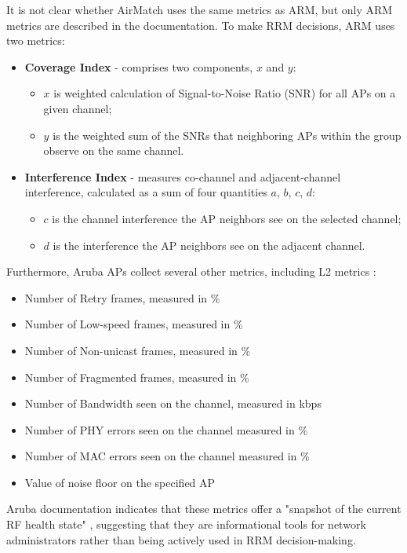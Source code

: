 It is not clear whether AirMatch uses the same metrics as ARM, but only ARM metrics are described in the documentation.
To make RRM decisions, ARM uses two metrics:
\begin{itemize}
    \item \textbf{Coverage Index} - comprises two components, $x$ and $y$:
    \begin{itemize}
        \item $x$ is weighted calculation of Signal-to-Noise Ratio (SNR) for all APs on a given channel;
        \item $y$ is the weighted sum of the SNRs that neighboring APs within the group observe on the same channel.
    \end{itemize}
    \item \textbf{Interference Index} - measures co-channel and adjacent-channel interference, calculated as a sum of four quantities $a$, $b$, $c$, $d$:
    \begin{itemize}
        \item $c$ is the channel interference the AP neighbors see on the selected channel;
        \item $d$ is the interference the AP neighbors see on the adjacent channel.
    \end{itemize}
\end{itemize}
Furthermore, Aruba APs collect several other metrics, including L2 metrics \cite{ArubaOSUserGuide}:

\begin{itemize}
    \item Number of Retry frames, measured in \%
    \item Number of Low-speed frames, measured in \%
    \item Number of Non-unicast frames, measured in \%
    \item Number of Fragmented frames, measured in \%
    \item Number of Bandwidth seen on the channel, measured in kbps
    \item Number of PHY errors seen on the channel measured in \%
    \item Number of MAC errors seen on the channel measured in \%
    \item Value of noise floor on the specified AP
\end{itemize}

Aruba documentation indicates that these metrics offer a "snapshot of the current RF health state" \cite{ARMMetrics}, suggesting that they are informational tools for network administrators rather than being actively used in RRM decision-making.

